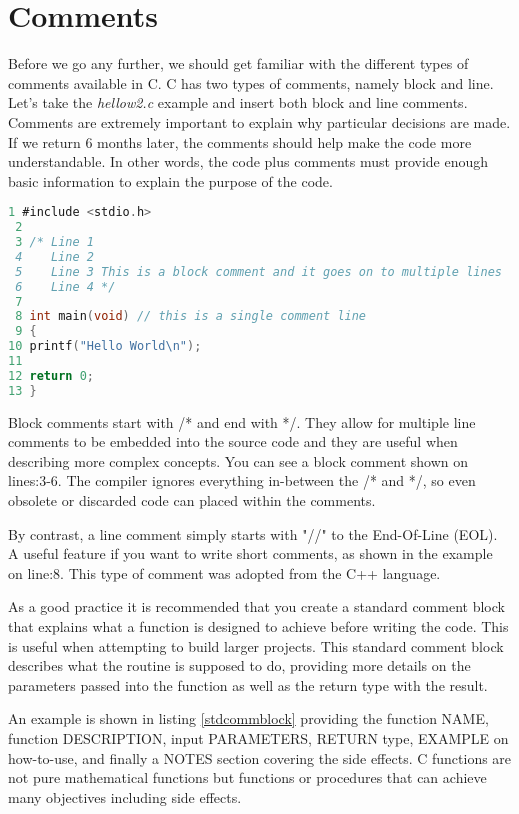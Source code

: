 \section{Comments}

Before we go any further, we should get familiar with the different types of comments  available in C. C has two types of comments, namely block and line.  Let's take the \textit{hellow2.c} example and insert both block and line comments. Comments are extremely important to explain why particular decisions are made. If we return 6 months later, the comments should help make the code more understandable. In other words, the code plus comments must provide enough basic information to explain the purpose of the code.\\

\begin{lstlisting}[language=C,showstringspaces=false,caption={File hellow2.c, with block and line comments},captionpos=b]
 1 #include <stdio.h>
 2
 3 /* Line 1
 4    Line 2
 5    Line 3 This is a block comment and it goes on to multiple lines
 6    Line 4 */
 7 
 8 int main(void) // this is a single comment line 
 9 {
10 printf("Hello World\n");
11
12 return 0;
13 }
\end{lstlisting}

Block comments start with /* and end with */. They allow for multiple line comments to be embedded into the source code and they are useful when describing more complex concepts. You can see a block comment shown on lines:3-6. The compiler ignores everything in-between the /* and */, so even obsolete or discarded code can placed within the comments. 

By contrast, a line comment simply starts with "//" to the End-Of-Line (EOL). A useful feature if you want to write short comments, as shown in the example on line:8. This type of comment was adopted from the C++ language.

As a good practice it is recommended that you create a standard comment block that explains what a function is designed to achieve before writing the code. This is useful when attempting to build larger projects. This standard comment block describes what the routine is supposed to do, providing more details on the parameters passed into the function as well as the return type with the result. 

An example is shown in listing \ref{stdcommblock} providing the function NAME, function DESCRIPTION, input PARAMETERS, RETURN type, EXAMPLE on how-to-use, and finally a NOTES section covering the side effects. C functions are not pure mathematical functions but functions or procedures that can achieve many objectives including side effects. 

